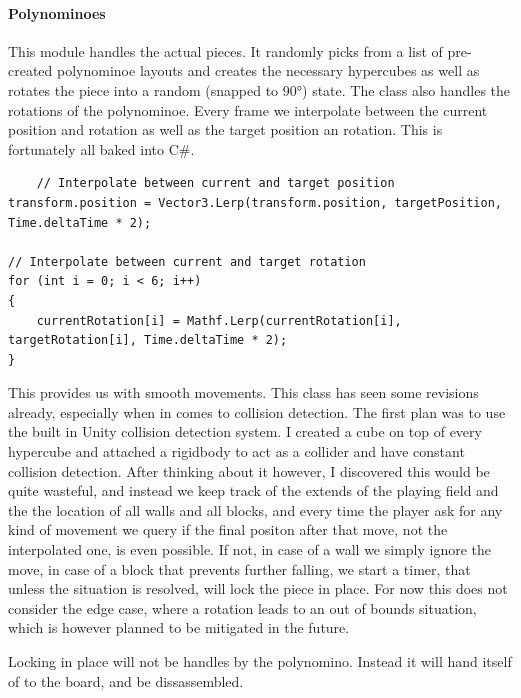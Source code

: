 \documentclass{article}
\begin{document}
\paragraph{Polynominoes}
This module  handles the actual pieces. It randomly picks from a list of pre-created polynominoe layouts and creates the necessary hypercubes as well as rotates the piece into a random (snapped to 90°) state. The class also handles the rotations of the polynominoe. Every frame we interpolate
between the current position and rotation as well as the target position an rotation. This is fortunately all baked into C\#.
\begin{verbatim}
    // Interpolate between current and target position
transform.position = Vector3.Lerp(transform.position, targetPosition, Time.deltaTime * 2);

// Interpolate between current and target rotation
for (int i = 0; i < 6; i++)
{
    currentRotation[i] = Mathf.Lerp(currentRotation[i], targetRotation[i], Time.deltaTime * 2);
}
\end{verbatim}
This provides us with smooth movements.
This class has seen some revisions already, especially when in comes to collision detection.
The first plan was to use the built in Unity collision detection system. I created a cube on top of every hypercube and attached a rigidbody to act as a collider and have constant collision detection. After thinking about it however, I discovered this would be quite wasteful, and instead we keep track of the extends of the playing field and the the location of all walls and all blocks, and every time the player ask for any kind of movement we query if the final positon after that move, not the interpolated one, is even possible. If not, in case of a wall we simply ignore the move, in case of a block that prevents further falling, we start a timer, that unless the situation is resolved, will lock the piece in place.
For now this does not consider the edge case, where a rotation leads to an out of bounds situation, which is however planned to be mitigated in the future.

Locking in place will not be handles by the polynomino. Instead it will hand itself of to the board, and be dissassembled.
\end{document}
